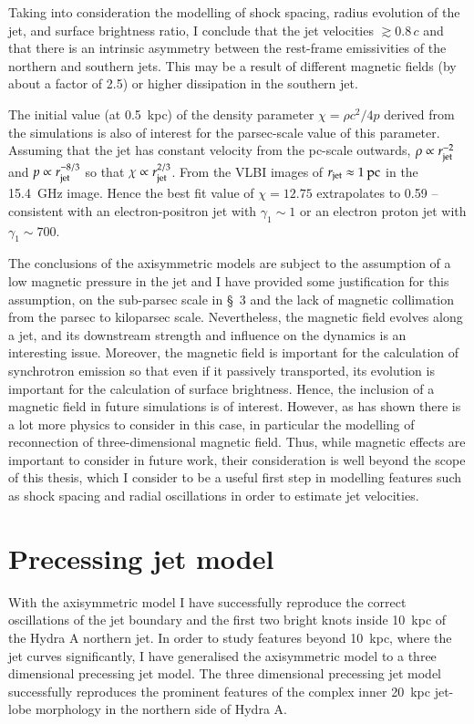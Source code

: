 Taking into consideration the modelling of shock spacing, radius evolution of the jet, and surface brightness ratio, I conclude that the jet velocities $\gtrsim 0.8 \, c$ and that there is an intrinsic asymmetry between the rest-frame emissivities of the northern and southern jets. This may be a result of different magnetic fields (by about a factor of 2.5) or higher dissipation in the southern jet. 


The initial value (at 0.5~kpc) of the density parameter $\chi = \rho c^2 / 4 p$ derived from the simulations is also of interest for the parsec-scale value of this parameter. Assuming that the jet has constant velocity from the pc-scale outwards, $\rho \propto r_{\rm jet}^{-2}$ and $p \propto r_{\rm jet}^{-8/3}$ so that $\chi \propto r_{\rm jet}^{2/3}$. From the VLBI images of \citet{taylor96} $r_{\rm jet} \approx 1 \> \rm pc$ in the 15.4~GHz image. Hence the best fit value of $\chi = 12.75$ extrapolates to 0.59 -- consistent with an electron-positron jet with $\gamma_1 \sim 1$ or an electron proton jet with $\gamma_1 \sim 700$.

 
The conclusions of the axisymmetric models are subject to the assumption of a low magnetic pressure in the jet and I have provided some justification for this assumption, on the sub-parsec scale in \S~3 and the lack of magnetic collimation from the parsec to kiloparsec scale. Nevertheless, the magnetic field evolves along a jet, and its downstream strength and influence on the dynamics is an interesting issue. Moreover, the magnetic field is important for the calculation of synchrotron emission so that even if it passively transported, its evolution is important for the calculation of surface brightness. Hence, the inclusion of a magnetic field in future simulations is of interest. However, as \citet{spruit11a} has shown there is a lot more physics to consider in this case, in particular the modelling of reconnection of three-dimensional magnetic field. Thus, while magnetic effects are important to consider in future work, their consideration is well beyond the scope of this thesis, which I consider to be a useful first step in modelling features such as shock spacing and radial oscillations in order to estimate jet velocities.

\section{Precessing jet model}
With the axisymmetric model I have successfully reproduce the correct oscillations of the jet boundary and the first two bright knots inside 10~kpc of the Hydra A northern jet. In order to study features beyond 10~kpc, where the jet curves significantly, I have generalised the axisymmetric model to a three dimensional precessing jet model. The  three dimensional precessing jet model successfully reproduces the prominent features of the complex inner 20~kpc jet-lobe morphology in the northern side of Hydra A. 

